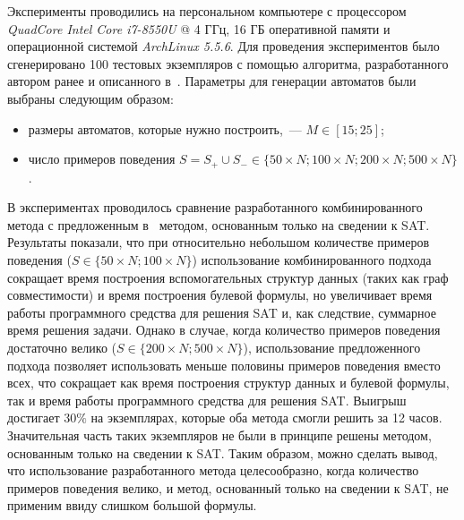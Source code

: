Эксперименты проводились на персональном компьютере с процессором \emph{QuadCore Intel Core i7-8550U} @ 4 ГГц, 16 ГБ оперативной памяти и операционной системой \emph{ArchLinux 5.5.6}. Для проведения экспериментов было сгенерировано 100 тестовых экземпляров с помощью алгоритма, разработанного автором ранее и описанного в~\cite{zakirzyanov2017DataMode}.
Параметры для генерации автоматов были выбраны следующим образом:
\begin{itemize}
  \item размеры автоматов, которые нужно построить,~--- $M \in \left[15; 25\right]$;
  \item число примеров поведения $S = S_{+} \cup S_{-} \in \{50 \times N; 100 \times N; 200 \times N; 500 \times N\}$.
\end{itemize}
В экспериментах проводилось сравнение разработанного комбинированного метода с предложенным в~\cite{zakirzyanov2019LATA} методом, основанным только на сведении к SAT.
Результаты показали, что при относительно небольшом количестве примеров поведения ($S \in \{50 \times N; 100 \times N\}$) использование комбинированного подхода сокращает время построения вспомогательных структур данных (таких как граф совместимости) и время построения булевой формулы, но увеличивает время работы программного средства для решения SAT и, как следствие, суммарное время решения задачи.
Однако в случае, когда количество примеров поведения достаточно велико ($S \in \{200 \times N; 500 \times N\}$), использование предложенного подхода позволяет использовать меньше половины примеров поведения вместо всех, что сокращает как время построения структур данных и булевой формулы, так и время работы программного средства для решения SAT.
Выигрыш достигает $30 \%$ на экземплярах, которые оба метода смогли решить за 12 часов.
Значительная часть таких экземпляров не были в принципе решены методом, основанным только на сведении к SAT.
Таким образом, можно сделать вывод, что использование разработанного метода целесообразно, когда количество примеров поведения велико, и метод, основанный только на сведении к SAT, не применим ввиду слишком большой формулы.


\chresults{\ref{sec:cegar}}
